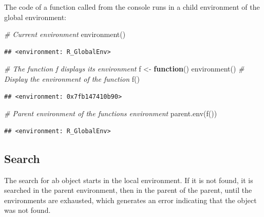 \documentclass[
  12pt,
  american,
  a4paper,
  extrafontsizes,onecolumn,openright
  ]{memoir}
\newenvironment{Shaded}{\begin{snugshade}}{\end{snugshade}}
\newcommand{\CommentTok}[1]{\textcolor[rgb]{0.56,0.35,0.01}{\textit{#1}}}
\newcommand{\ControlFlowTok}[1]{\textcolor[rgb]{0.13,0.29,0.53}{\textbf{#1}}}
\newcommand{\FunctionTok}[1]{\textcolor[rgb]{0.00,0.00,0.00}{#1}}
\newcommand{\NormalTok}[1]{#1}
\newcommand{\OtherTok}[1]{\textcolor[rgb]{0.56,0.35,0.01}{#1}}
\begin{document}
\normalsize

The code of a function called from the console runs in a child environment of the global environment:

\scriptsize

\begin{Shaded}
\begin{Highlighting}[]
\CommentTok{\# Current environment}
\FunctionTok{environment}\NormalTok{()}
\end{Highlighting}
\end{Shaded}

\begin{verbatim}
## <environment: R_GlobalEnv>
\end{verbatim}

\begin{Shaded}
\begin{Highlighting}[]
\CommentTok{\# The function f displays its environment}
\NormalTok{f }\OtherTok{\textless{}{-}} \ControlFlowTok{function}\NormalTok{() }\FunctionTok{environment}\NormalTok{()}
\CommentTok{\# Display the environment of the function}
\FunctionTok{f}\NormalTok{()}
\end{Highlighting}
\end{Shaded}

\begin{verbatim}
## <environment: 0x7fb147410b90>
\end{verbatim}

\begin{Shaded}
\begin{Highlighting}[]
\CommentTok{\# Parent environment of the function\textquotesingle{}s environment}
\FunctionTok{parent.env}\NormalTok{(}\FunctionTok{f}\NormalTok{())}
\end{Highlighting}
\end{Shaded}

\begin{verbatim}
## <environment: R_GlobalEnv>
\end{verbatim}

\normalsize

\hypertarget{search}{%
\subsection{Search}\label{search}}

The search for ab object starts in the local environment.
If it is not found, it is searched in the parent environment, then in the parent of the parent, until the environments are exhausted, which generates an error indicating that the object was not found.
\end{document}
